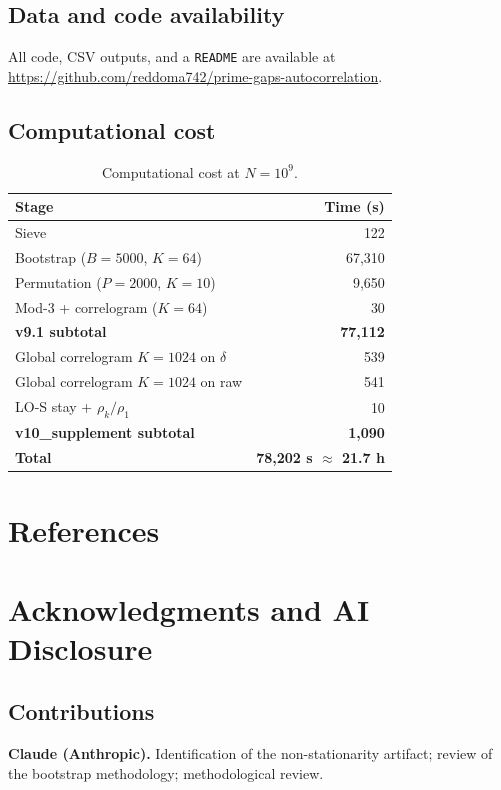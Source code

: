 \documentclass[11pt]{article}
\newcommand{\RepoURL}{https://github.com/reddoma742/prime-gaps-autocorrelation}
\begin{document}
\subsection{Data and code availability}
All code, CSV outputs, and a \texttt{README} are available at
\url{\RepoURL}.

\subsection{Computational cost}
\begin{table}[H]\centering
\caption{Computational cost at $N = 10^9$.}
\label{tab:cost}
\begin{tabular}{lr}
\toprule
Stage & Time (s) \\
\midrule
Sieve & 122 \\
Bootstrap ($B = 5000$, $K = 64$) & 67,310 \\
Permutation ($P = 2000$, $K = 10$) & 9,650 \\
Mod-3 + correlogram ($K = 64$) & 30 \\
\textbf{v9.1 subtotal} & \textbf{77,112} \\
Global correlogram $K = 1024$ on $\delta$ & 539 \\
Global correlogram $K = 1024$ on raw & 541 \\
LO-S stay + $\rho_k/\rho_1$ & 10 \\
\textbf{v10\_supplement subtotal} & \textbf{1,090} \\
\textbf{Total} & \textbf{78,202 s $\approx$ 21.7 h} \\
\bottomrule
\end{tabular}
\end{table}

\clearpage
\section*{References}\label{sec:refs}



\section{Acknowledgments and AI Disclosure}\label{sec:ack}

\subsection{Contributions}
\textbf{Claude (Anthropic).} Identification of the non-stationarity
artifact; review of the bootstrap methodology; methodological review.
\end{document}
